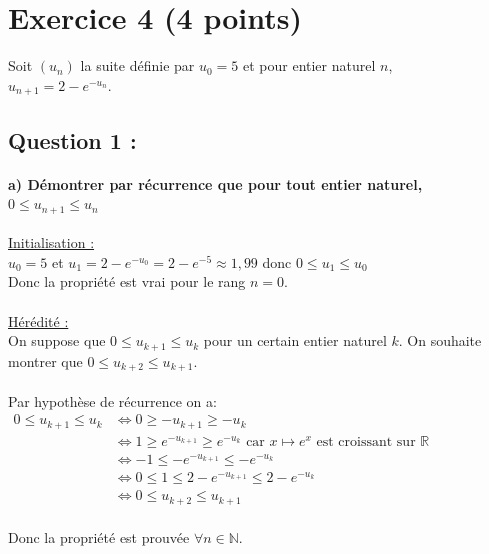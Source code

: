 \documentclass[a4paper, 12pt]{article}
\begin{document}
{}
\section*{Exercice 4 (4 points)}

Soit $(u_n)$ la suite définie par $u_0 = 5$ et pour entier naturel $n$, \\ $u_{n+1} = 2 - e^{-u_n}$.

{}
\subsection*{Question 1 :}

{}
\paragraph*{a) Démontrer par récurrence que pour tout entier naturel,\\ $0 \leq u_{n+1} \leq u_n$\\[5mm]}

\underline{Initialisation :}
\\
$u_0 = 5$ et $u_1 = 2 - e^{-u_0} = 2 - e^{-5} \approx 1,99$ donc $0 \leq u_1 \leq u_0$ 
\\
Donc la propriété est vrai pour le rang $n = 0$.
\\
\\
\underline{Hérédité :}
\\
On suppose que $0 \leq u_{k+1} \leq u_k$ pour un certain entier naturel $k$. On souhaite montrer que $0 \leq u_{k+2} \leq u_{k+1}$.
\\ \\
Par hypothèse de récurrence on a:
\\
$ \begin{aligned}
0 \leq u_{k+1} \leq u_k 
&\iff 0 \geq -u_{k+1} \geq -u_{k} \\
&\iff 1 \geq e^{-u_{k+1}} \geq e^{-u_k} \text{ car } x \mapsto e^x \text{ est croissant sur } \mathbb{R} \\
&\iff -1 \leq - e^{-u_{k+1}} \leq - e^{-u_k} \\
&\iff 0 \leq 1 \leq 2 - e^{-u_{k+1}} \leq 2 - e^{-u_k} \\
&\iff 0 \leq u_{k+2} \leq u_{k+1} 
\end{aligned}$
\\ \\
Donc la propriété est prouvée $\forall n \in \mathbb{N}$.
\end{document}
